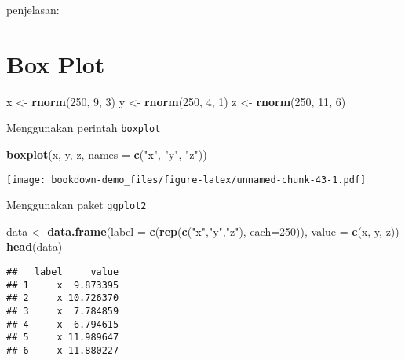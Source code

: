 \documentclass[
]{book}
\newenvironment{Shaded}{\begin{snugshade}}{\end{snugshade}}
\newcommand{\DataTypeTok}[1]{\textcolor[rgb]{0.13,0.29,0.53}{#1}}
\newcommand{\DecValTok}[1]{\textcolor[rgb]{0.00,0.00,0.81}{#1}}
\newcommand{\KeywordTok}[1]{\textcolor[rgb]{0.13,0.29,0.53}{\textbf{#1}}}
\newcommand{\NormalTok}[1]{#1}
\newcommand{\StringTok}[1]{\textcolor[rgb]{0.31,0.60,0.02}{#1}}
\begin{document}
penjelasan:

\hypertarget{box-plot}{%
\section{Box Plot}\label{box-plot}}

\begin{Shaded}
\begin{Highlighting}[]
\NormalTok{x <-}\StringTok{ }\KeywordTok{rnorm}\NormalTok{(}\DecValTok{250}\NormalTok{, }\DecValTok{9}\NormalTok{, }\DecValTok{3}\NormalTok{)}
\NormalTok{y <-}\StringTok{ }\KeywordTok{rnorm}\NormalTok{(}\DecValTok{250}\NormalTok{, }\DecValTok{4}\NormalTok{, }\DecValTok{1}\NormalTok{)}
\NormalTok{z <-}\StringTok{ }\KeywordTok{rnorm}\NormalTok{(}\DecValTok{250}\NormalTok{, }\DecValTok{11}\NormalTok{, }\DecValTok{6}\NormalTok{)}
\end{Highlighting}
\end{Shaded}

Menggunakan perintah \texttt{boxplot}

\begin{Shaded}
\begin{Highlighting}[]
\KeywordTok{boxplot}\NormalTok{(x, y, z,}
        \DataTypeTok{names =} \KeywordTok{c}\NormalTok{(}\StringTok{"x"}\NormalTok{, }\StringTok{"y"}\NormalTok{, }\StringTok{"z"}\NormalTok{))}
\end{Highlighting}
\end{Shaded}

\texttt{[image: bookdown-demo\_files/figure-latex/unnamed-chunk-43-1.pdf]}

Menggunakan paket \texttt{ggplot2}

\begin{Shaded}
\begin{Highlighting}[]
\NormalTok{data <-}\StringTok{ }\KeywordTok{data.frame}\NormalTok{(}\DataTypeTok{label =} \KeywordTok{c}\NormalTok{(}\KeywordTok{rep}\NormalTok{(}\KeywordTok{c}\NormalTok{(}\StringTok{"x"}\NormalTok{,}\StringTok{"y"}\NormalTok{,}\StringTok{"z"}\NormalTok{),}
                                 \DataTypeTok{each=}\DecValTok{250}\NormalTok{)),}
                   \DataTypeTok{value =} \KeywordTok{c}\NormalTok{(x, y, z))}
\KeywordTok{head}\NormalTok{(data)}
\end{Highlighting}
\end{Shaded}

\begin{verbatim}
##   label     value
## 1     x  9.873395
## 2     x 10.726370
## 3     x  7.784859
## 4     x  6.794615
## 5     x 11.989647
## 6     x 11.880227
\end{verbatim}
\end{document}
